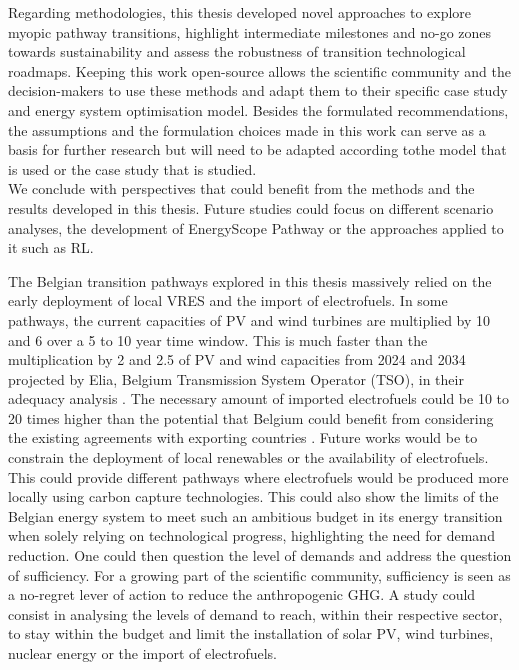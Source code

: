 Regarding methodologies, this thesis developed novel approaches to explore myopic pathway transitions, highlight intermediate milestones and no-go zones towards sustainability and assess the robustness of transition technological roadmaps. Keeping this work open-source allows the scientific community and the decision-makers to use these methods and adapt them to their specific case study and energy system optimisation model. Besides the formulated recommendations, the assumptions and the formulation choices made in this work can serve as a basis for further research but will need to be adapted according tothe model that is used or the case study that is studied.\\


We conclude with perspectives that could benefit from the methods and the results developed in this thesis.  Future studies could focus on different scenario analyses, the development of EnergyScope Pathway or the approaches applied to it such as \gls{RL}. 

The Belgian transition pathways explored in this thesis massively relied on the early deployment of local \gls{VRES} and the import of electrofuels. In some pathways, the current capacities of \gls{PV} and wind turbines are multiplied by 10 and 6 over a 5 to 10 year time window. This is much faster than the multiplication by 2 and 2.5 of PV and wind capacities from 2024 and 2034 projected by Elia, Belgium Transmission System Operator (TSO), in their adequacy analysis \cite{Elia_2024_2034}. The necessary amount of imported electrofuels could be 10 to 20 times higher than the potential that Belgium could benefit from considering the existing agreements with exporting countries \cite{lefebvre2022electrofuel}. Future works would be to constrain the deployment of local renewables or the availability of electrofuels. This could provide different pathways where electrofuels would be produced more locally using carbon capture technologies. This could also show the limits of the Belgian energy system to meet such an ambitious  budget in its energy transition when solely relying on technological progress, highlighting the need for demand reduction. One could then question the level of demands and address the question of sufficiency. For a growing part of the scientific community, sufficiency is seen as a no-regret lever of action to reduce the anthropogenic \gls{GHG}. A study could consist in analysing the levels of demand to reach, within their respective sector, to stay within the  budget and limit the installation of solar PV, wind turbines, nuclear energy or the import of electrofuels.

